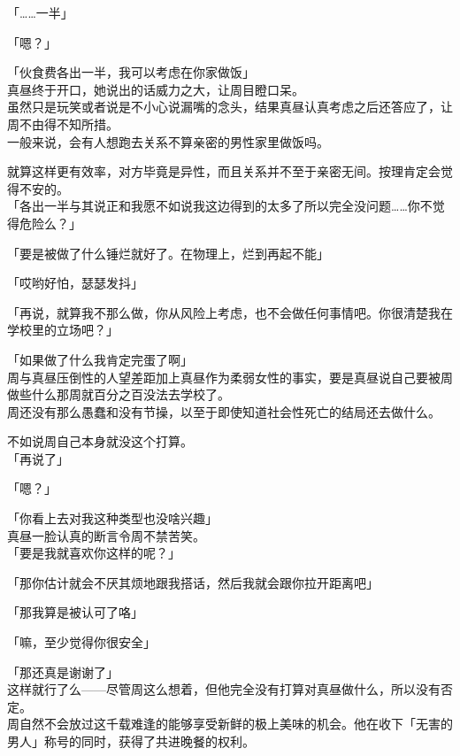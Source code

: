 「……一半」

「嗯？」

「伙食费各出一半，我可以考虑在你家做饭」\\

真昼终于开口，她说出的话威力之大，让周目瞪口呆。\\

虽然只是玩笑或者说是不小心说漏嘴的念头，结果真昼认真考虑之后还答应了，让周不由得不知所措。\\

一般来说，会有人想跑去关系不算亲密的男性家里做饭吗。

就算这样更有效率，对方毕竟是异性，而且关系并不至于亲密无间。按理肯定会觉得不安的。\\

「各出一半与其说正和我愿不如说我这边得到的太多了所以完全没问题……你不觉得危险么？」

「要是被做了什么锤烂就好了。在物理上，烂到再起不能」

「哎哟好怕，瑟瑟发抖」

「再说，就算我不那么做，你从风险上考虑，也不会做任何事情吧。你很清楚我在学校里的立场吧？」

「如果做了什么我肯定完蛋了啊」\\

周与真昼压倒性的人望差距加上真昼作为柔弱女性的事实，要是真昼说自己要被周做些什么那周就百分之百没法去学校了。\\

周还没有那么愚蠢和没有节操，以至于即使知道社会性死亡的结局还去做什么。

不如说周自己本身就没这个打算。\\

「再说了」

「嗯？」

「你看上去对我这种类型也没啥兴趣」\\

真昼一脸认真的断言令周不禁苦笑。\\

「要是我就喜欢你这样的呢？」

「那你估计就会不厌其烦地跟我搭话，然后我就会跟你拉开距离吧」

「那我算是被认可了咯」

「嘛，至少觉得你很安全」

「那还真是谢谢了」\\

这样就行了么——尽管周这么想着，但他完全没有打算对真昼做什么，所以没有否定。\\

周自然不会放过这千载难逢的能够享受新鲜的极上美味的机会。他在收下「无害的男人」称号的同时，获得了共进晚餐的权利。
